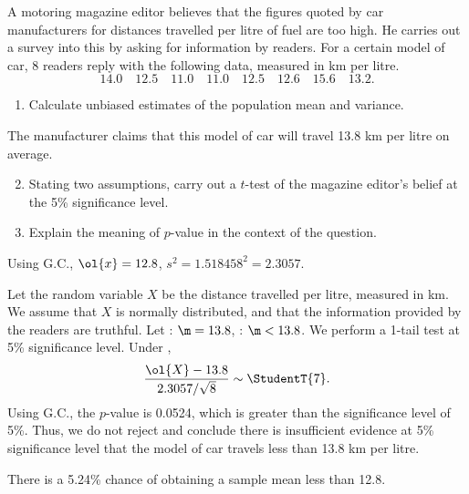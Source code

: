\begin{problem}
    A motoring magazine editor believes that the figures quoted by car manufacturers for distances travelled per litre of fuel are too high. He carries out a survey into this by asking for information by readers. For a certain model of car, 8 readers reply with the following data, measured in km per litre. \[14.0 \quad 12.5 \quad 11.0 \quad 11.0 \quad 12.5 \quad12.6 \quad 15.6 \quad 13.2.\]

    \begin{enumerate}
        \item Calculate unbiased estimates of the population mean and variance.
    \end{enumerate}
    
    The manufacturer claims that this model of car will travel 13.8 km per litre on average.

    \begin{enumerate}
        \setcounter{enumi}{1}
        \item Stating two assumptions, carry out a $t$-test of the magazine editor's belief at the 5\% significance level.
        \item Explain the meaning of $p$-value in the context of the question.
    \end{enumerate}
\end{problem}
\begin{solution}
    \begin{ppart}
        Using G.C., $\ol{x} = 12.8$, $s^2 = 1.518458^2 = 2.3057$.
    \end{ppart}
    \begin{ppart}
        Let the random variable $X$ be the distance travelled per litre, measured in km. We assume that $X$ is normally distributed, and that the information provided by the readers are truthful. Let \nullhyp: $\m = 13.8$, \althyp: $\m < 13.8$. We perform a 1-tail test at 5\% significance level. Under \nullhyp, \[\frac{\ol{X} - 13.8}{2.3057/\sqrt{8}} \sim \StudentT{7}.\] Using G.C., the $p$-value is 0.0524, which is greater than the significance level of 5\%. Thus, we do not reject \nullhyp{} and conclude there is insufficient evidence at 5\% significance level that the model of car travels less than 13.8 km per litre.
    \end{ppart}
    \begin{ppart}
        There is a 5.24\% chance of obtaining a sample mean less than 12.8.
    \end{ppart}
\end{solution}

